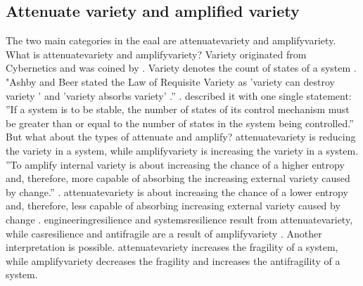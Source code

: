 \subsection{Attenuate variety and amplified variety}
\label{sub:attenuatevsaplify}
The two main categories in the \acrlong{eaal} are \gls{attenuatevariety} and \gls{amplifyvariety}. What is \gls{attenuatevariety} and \gls{amplifyvariety}? Variety originated from Cybernetics and was coined by \textcite{Ashby1956}. Variety denotes the count of states of a system \parencites{Ashby1956}{Ashby1958}. "Ashby and Beer stated the Law of Requisite Variety as 'variety can destroy variety ' \parencite[p.~207]{Ashby1956} and 'variety absorbs variety' \parencite[p.~286]{Beer1979}.'' \parencite[p.~31]{Botjes2020}. \textcite{Heylighen2001} described it with one single statement: ''If a system is to be stable, the number of states of its control mechanism must be greater than or equal to the number of states in the system being controlled.'' But what about the types of attenuate and amplify? \Gls{attenuatevariety} is reducing the variety in a system, while \gls{amplifyvariety} is increasing the variety in a system. ''To amplify internal variety is about increasing the chance of a higher \gls{entropy} and, therefore, more capable of absorbing the increasing external variety caused by change.'' \parencite[p.~31]{Botjes2021}. \Gls{attenuatevariety} is about increasing the chance of a lower \gls{entropy} and, therefore, less capable of absorbing increasing external variety caused by change \parencite[p.~31]{Botjes2021}. \Gls{engineeringresilience} and \gls{systemsresilience} result from \gls{attenuatevariety}, while \gls{casresilience} and \gls{antifragile} are a result of \gls{amplifyvariety} \parencite[p.~31]{Botjes2021}. Another interpretation is possible. \Gls{attenuatevariety} increases the \gls{fragility} of a system, while \gls{amplifyvariety} decreases the \gls{fragility} and increases the \gls{antifragility} of a system.
